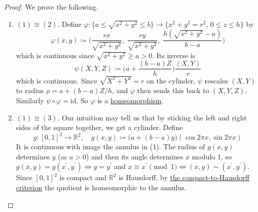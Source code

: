 	\begin{proof}
	  We prove the following. 
		\begin{enumerate}
		  \item $(1) \cong (2)$. Define $\varphi: \{a \leq \sqrt{x^2 + y^2} \leq b\} \rightarrow \{x^2 + y^2 = r^2, \, 0 \leq z \leq h\}$ by 
				\begin{equation}
					\varphi(x, y) \coloneqq \Big( \frac{r x}{\sqrt{x^2 + y^2}}, \; \frac{r y}{\sqrt{x^2 + y^2}}, \; \frac{h(\sqrt{x^2 + y^2} - a)}{b - a} \Big)
				\end{equation}
				which is continuous since $\sqrt{x^2 + y^2} \geq a > 0$. Its inverse is 
				\begin{equation}
					\psi(X, Y, Z) \coloneqq \Big( a + \frac{(b - a) Z}{h} \Big) \frac{(X, Y)}{r}
				\end{equation}
				which is continuous. Since $\sqrt{X^2 + Y^2} = r$ on the cylinder, $\psi$ rescales $(X, Y)$ to radius $\rho = a + (b-a)Z/h$, and $\varphi$ then sends this back to $(X, Y, Z)$. Similarly $\psi \circ \varphi = \mathrm{id}$. So $\varphi$ is a \hyperref[def:homeomorphism]{homeomorphism}. 

			\item $(1) \cong (3)$. Our intuition may tell us that by sticking the left and right sides of the square together, we get a cylinder. Define 
				\begin{equation}
					g: [0, 1]^2 \rightarrow \mathbb{R}^2, \quad g(x, y) \coloneqq \big(a + (b - a) y\big) (\cos 2\pi x, \sin 2\pi x)
				\end{equation}
				It is continuous with image the annulus in (1). The radius of $g(x, y)$ determines $y$ (as $a > 0$) and then its angle determines $x$ modulo $1$, so $g(x, y) = g(x^\prime, y^\prime) \iff y = y^\prime$ and $x \equiv x^\prime \pmod 1 \iff (x, y) \sim (x^\prime, y^\prime)$. Since $[0, 1]^2$ is compact and $\mathbb{R}^2$ is Hausdorff, by \hyperref[thm:compact_hausdorff_quotient]{the compact-to-Hausdorff criterion} the quotient is homeomorphic to the annulus. 
		\end{enumerate}
	\end{proof}

